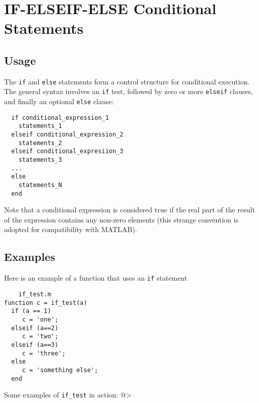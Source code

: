 \section{IF-ELSEIF-ELSE Conditional Statements}

\subsection{Usage}

The \verb|if| and \verb|else| statements form a control structure for
conditional execution.  The general syntax involves an \verb|if|
test, followed by zero or more \verb|elseif| clauses, and finally
an optional \verb|else| clause:
\begin{verbatim}
  if conditional_expression_1
    statements_1
  elseif conditional_expression_2
    statements_2
  elseif conditional_expresiion_3
    statements_3
  ...
  else
    statements_N
  end
\end{verbatim}
Note that a conditional expression is considered true if 
the real part of the result of the expression contains
any non-zero elements (this strange convention is adopted
for compatibility with MATLAB).
\subsection{Examples}

Here is an example of a function that uses an \verb|if| statement
\begin{verbatim}
    if_test.m
function c = if_test(a)
  if (a == 1)
     c = 'one';
  elseif (a==2)
     c = 'two';
  elseif (a==3)
     c = 'three';
  else
     c = 'something else';
  end
\end{verbatim}
Some examples of \verb|if_test| in action:
@>
